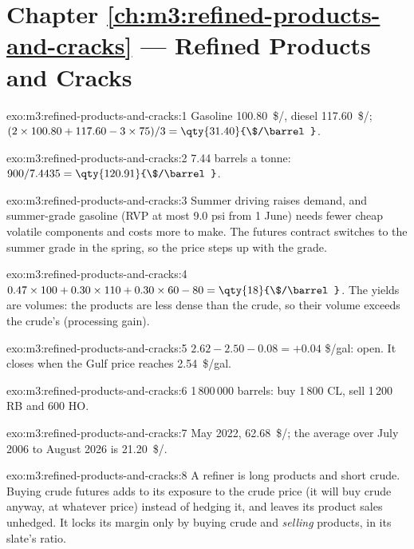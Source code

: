 \section*{Chapter \ref{ch:m3:refined-products-and-cracks} --- Refined Products and Cracks}

\begin{solution}{exo:m3:refined-products-and-cracks:1}
Gasoline \qty{100.80}{\$/\barrel}, diesel \qty{117.60}{\$/\barrel}; $(2 \times 100.80 +
117.60 - 3 \times 75)/3 = \qty{31.40}{\$/\barrel}$.
\end{solution}

\begin{solution}{exo:m3:refined-products-and-cracks:2}
7.44 barrels a tonne: $900/7.4435 = \qty{120.91}{\$/\barrel}$.
\end{solution}

\begin{solution}{exo:m3:refined-products-and-cracks:3}
Summer driving raises demand, and summer-grade gasoline (RVP at most 9.0 psi from 1
June) needs fewer cheap volatile components and costs more to make. The futures contract
switches to the summer grade in the spring, so the price steps up with the grade.
\end{solution}

\begin{solution}{exo:m3:refined-products-and-cracks:4}
$0.47 \times 100 + 0.30 \times 110 + 0.30 \times 60 - 80 = \qty{18}{\$/\barrel}$. The
yields are volumes: the products are less dense than the crude, so their volume exceeds
the crude's (processing gain).
\end{solution}

\begin{solution}{exo:m3:refined-products-and-cracks:5}
$2.62 - 2.50 - 0.08 = +0.04$ \$/gal: open. It closes when the Gulf price reaches
\qty{2.54}{\$/gal}.
\end{solution}

\begin{solution}{exo:m3:refined-products-and-cracks:6}
1\,800\,000 barrels: buy 1\,800 CL, sell 1\,200 RB and 600 HO.
\end{solution}

\begin{solution}{exo:m3:refined-products-and-cracks:7}
May 2022, \qty{62.68}{\$/\barrel}; the average over July 2006 to August 2026 is
\qty{21.20}{\$/\barrel}.
\end{solution}

\begin{solution}{exo:m3:refined-products-and-cracks:8}
A refiner is long products and short crude. Buying crude futures adds to its exposure to
the crude price (it will buy crude anyway, at whatever price) instead of hedging it, and
leaves its product sales unhedged. It locks its margin only by buying crude and
\emph{selling} products, in its slate's ratio.
\end{solution}

